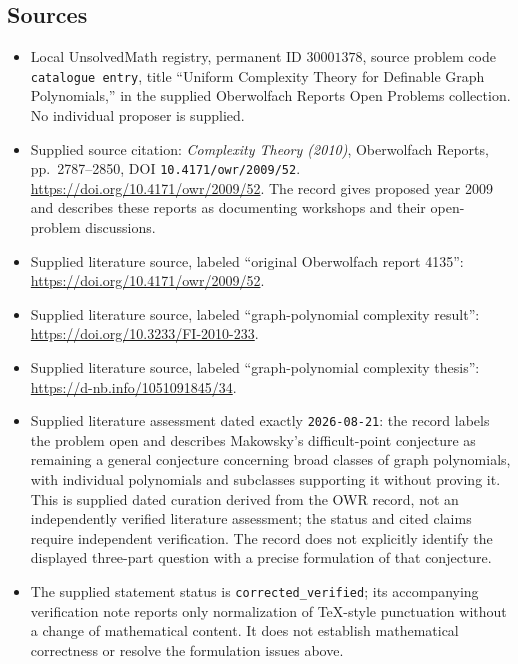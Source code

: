 \documentclass[11pt]{article}
\begin{document}
\subsection{Sources}
\begin{itemize}
\item Local UnsolvedMath registry, permanent ID \(30001378\), source problem code \texttt{catalogue entry}, title ``Uniform Complexity Theory for Definable Graph Polynomials,'' in the supplied Oberwolfach Reports Open Problems collection. No individual proposer is supplied.
\item Supplied source citation: \emph{Complexity Theory (2010)}, Oberwolfach Reports, pp.~2787--2850, DOI \texttt{10.4171/owr/2009/52}. \url{https://doi.org/10.4171/owr/2009/52}. The record gives proposed year 2009 and describes these reports as documenting workshops and their open-problem discussions.
\item Supplied literature source, labeled ``original Oberwolfach report 4135'': \url{https://doi.org/10.4171/owr/2009/52}.
\item Supplied literature source, labeled ``graph-polynomial complexity result'': \url{https://doi.org/10.3233/FI-2010-233}.
\item Supplied literature source, labeled ``graph-polynomial complexity thesis'': \url{https://d-nb.info/1051091845/34}.
\item Supplied literature assessment dated exactly \texttt{2026-08-21}: the record labels the problem open and describes Makowsky's difficult-point conjecture as remaining a general conjecture concerning broad classes of graph polynomials, with individual polynomials and subclasses supporting it without proving it. This is supplied dated curation derived from the OWR record, not an independently verified literature assessment; the status and cited claims require independent verification. The record does not explicitly identify the displayed three-part question with a precise formulation of that conjecture.
\item The supplied statement status is \texttt{corrected\_verified}; its accompanying verification note reports only normalization of TeX-style punctuation without a change of mathematical content. It does not establish mathematical correctness or resolve the formulation issues above.
\end{itemize}
\end{document}
